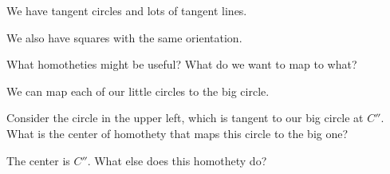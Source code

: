 





We have tangent circles and lots of tangent lines.

We also have squares with the same orientation.

What homotheties might be useful?  What do we want to map to what?


We can map each of our little circles to the big circle.

Consider the circle in the upper left, which is tangent to our big circle at $C''$. What is the center of homothety that maps this circle to the big one?









The center is $C''$. What else does this homothety do?

